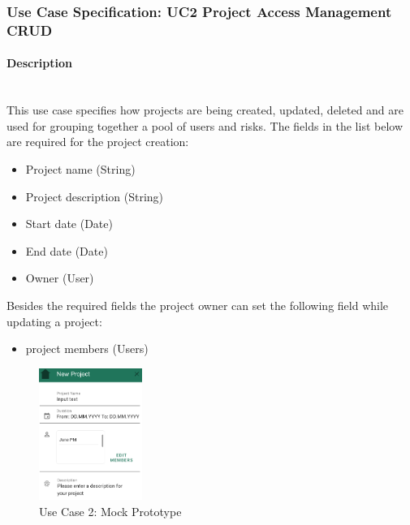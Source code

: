 
\newpage
\subsubsection{Use Case Specification: \ac{UC}2 Project Access Management CRUD}
\label{sec:domainBbc}

\paragraph*{Description}\mbox{}\\
This use case specifies how projects are being created, updated, deleted and are used for grouping together a pool of users and risks.
The fields in the list below are required for the project creation:

\begin{itemize}
	\vspace{-3mm}
	\setlength\itemsep{-1em}
	\item Project name (String)
	\item Project description (String)
	\item Start date (Date)
	\item End date (Date)
	\item Owner (User)
\end{itemize}
Besides the required fields the project owner can set the following field while updating a project:
\begin{itemize}
	\vspace{-3mm}
	\setlength\itemsep{-1em}
	\item project members (Users)
\end{itemize}

\begin{figure}
	\includegraphics[width=0.3\textwidth]{Assets/UC_Screenshots/UC2S.png}
	\caption{Use Case 2: Mock Prototype}
	\label{fig:useCase2Detail}
\end{figure}

